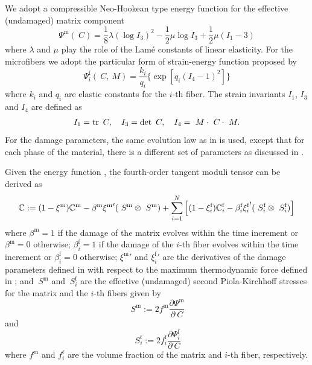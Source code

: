 \documentclass[12pt]{article}
\newcommand{\mtrx}{{\text{m}}}
\newcommand{\fiber}{{\text{f}}}
\numberwithin{equation}{section}
\begin{document}
We adopt a compressible Neo-Hookean type energy function for the
effective (undamaged) matrix component
\begin{equation}\label{eq:aniso-Psim0}
  \Psi^\mtrx (~C)
    = \frac{1}{8}\lambda (\log I_3)^2
    - \frac{1}{2}\mu \log I_3
    + \frac{1}{2}\mu( I_1 - 3)
\end{equation}
where $\lambda$ and $\mu$ play the role of the Lam\'{e} constants of
linear elasticity. For the microfibers we adopt the particular form of
strain-energy function proposed by \citet{Holzapfel.etal:2010}
\begin{equation}
  \Psi^\fiber_i(~C, ~M)
    = \frac{k_i}{q_i}
    \{ \exp[q_i(I_4 - 1)^2] \}
\end{equation}
where $k_i$ and $q_i$ are elastic constants for the $i$-th fiber.  The
strain invariants $I_1$, $I_3$ and $I_4$ are defined as
\begin{gather}
  I_1 = \operatorname{\text{tr}} ~C,
  \quad
  I_3 = \det ~C,
  \quad
  I_4 = ~M \cdot ~C \cdot ~M.
\end{gather}
For the damage parameters, the same evolution law as in
 is used, except that for each phase of the material,
there is a different set of parameters as discussed in
\citet{Chen.etal:2014}.

Given the energy function , the fourth-order
tangent moduli tensor can be derived as
\begin{equation}\label{eq:aniso-tangent}
  \bbC
  : =
  (1-\xi^\mtrx) \bbC^\mtrx
  -
  \beta^\mtrx {\xi^\mtrx}'  (~S^\mtrx \otimes ~S^\mtrx )
  +
  \sum_{i=1}^N
  \left[
    (1-\xi^\fiber_i) \bbC^\fiber_i
    -
    \beta^\fiber_i {\xi^\fiber_i}' (~S^\fiber_i \otimes ~S^\fiber_i)
  \right]
\end{equation}
where $\beta^\mtrx = 1$ if the damage of the matrix evolves within the
time increment or $\beta^\mtrx=0$ otherwise; $\beta^\fiber_i = 1$ if
the damage of the $i$-th fiber evolves within the time increment or
$\beta^\fiber_i=0$ otherwise; ${\xi^\mtrx}'$ and ${\xi^\fiber_i}'$ are
the derivatives of the damage parameters defined in 
with respect to the maximum thermodynamic force defined in
; and $~S^\mtrx$ and $~S^\fiber_i$ are the effective
(undamaged) second Piola-Kirchhoff stresses for the matrix and the
$i$-th fibers given by
\begin{equation}\label{eq:aniso-S0m}
  ~S^\mtrx
  :=
  2 f^\mtrx \frac{\partial \Psi^\mtrx}{\partial~C}
\end{equation}
and
\begin{equation}\label{eq:aniso-S0i}
  ~S^\fiber_i
  :=
  2 f^\fiber_i \frac{\partial \Psi^\fiber_i}{\partial~C}
\end{equation}
where $f^\mtrx$ and $f^\fiber_i$ are the volume fraction of the matrix
and $i$-th fiber, respectively.
\end{document}
